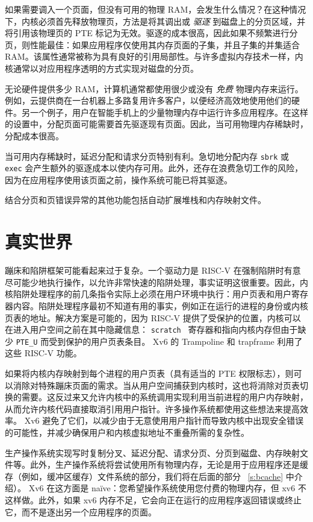 \documentclass[UTF8]{article}
\begin{document}
如果需要调入一个页面，但没有可用的物理 RAM，会发生什么情况？在这种情况下，内核必须首先释放物理页，方法是将其调出或  {    \it    驱逐   }  到磁盘上的分页区域，并将引用该物理页的 PTE 标记为无效。驱逐的成本很高，因此如果不频繁进行分页，则性能最佳：如果应用程序仅使用其内存页面的子集，并且子集的并集适合 RAM。该属性通常被称为具有良好的引用局部性。与许多虚拟内存技术一样，内核通常以对应用程序透明的方式实现对磁盘的分页。  

无论硬件提供多少 RAM，计算机通常都使用很少或没有  {    \it    免费   }  物理内存来运行。例如，云提供商在一台机器上多路复用许多客户，以便经济高效地使用他们的硬件。另一个例子，用户在智能手机上的少量物理内存中运行许多应用程序。在这样的设置中，分配页面可能需要首先驱逐现有页面。因此，当可用物理内存稀缺时，分配成本很高。  

当可用内存稀缺时，延迟分配和请求分页特别有利。急切地分配内存
    \lstinline{sbrk}    或    \lstinline{exec}    会产生额外的驱逐成本以使内存可用。此外，还存在浪费急切工作的风险，因为在应用程序使用该页面之前，操作系统可能已将其驱逐。  

结合分页和页错误异常的其他功能包括自动扩展堆栈和内存映射文件。  

   \section{真实世界  }     

蹦床和陷阱框架可能看起来过于复杂。一个驱动力是 RISC-V 在强制陷阱时有意尽可能少地执行操作，以允许非常快速的陷阱处理，事实证明这很重要。因此，内核陷阱处理程序的前几条指令实际上必须在用户环境中执行：用户页表和用户寄存器内容。陷阱处理程序最初不知道有用的事实，例如正在运行的进程的身份或内核页表的地址。解决方案是可能的，因为 RISC-V 提供了受保护的位置，内核可以在进入用户空间之前在其中隐藏信息：  {    \tt    scratch   }  寄存器和指向内核内存但由于缺少    \lstinline{PTE_U}    而受到保护的用户页表条目。 Xv6 的 Trampoline 和 trapframe 利用了这些 RISC-V 功能。  

如果将内核内存映射到每个进程的用户页表（具有适当的 PTE 权限标志），则可以消除对特殊蹦床页面的需求。当从用户空间捕获到内核时，这也将消除对页表切换的需要。这反过来又允许内核中的系统调用实现利用当前进程的用户内存映射，从而允许内核代码直接取消引用用户指针。许多操作系统都使用这些想法来提高效率。 Xv6 避免了它们，以减少由于无意使用用户指针而导致内核中出现安全错误的可能性，并减少确保用户和内核虚拟地址不重叠所需的复杂性。  

生产操作系统实现写时复制分叉、延迟分配、请求分页、分页到磁盘、内存映射文件等。此外，生产操作系统将尝试使用所有物理内存，无论是用于应用程序还是缓存（例如，缓冲区缓存）文件系统的部分，我们将在后面的部分~    \ref{s:bcache}    中介绍）。 Xv6 在这方面是 na\"{i}ve：您希望操作系统使用您付费的物理内存，但 xv6 不这样做。此外，如果 xv6 内存不足，它会向正在运行的应用程序返回错误或终止它，而不是逐出另一个应用程序的页面。  
\end{document}
